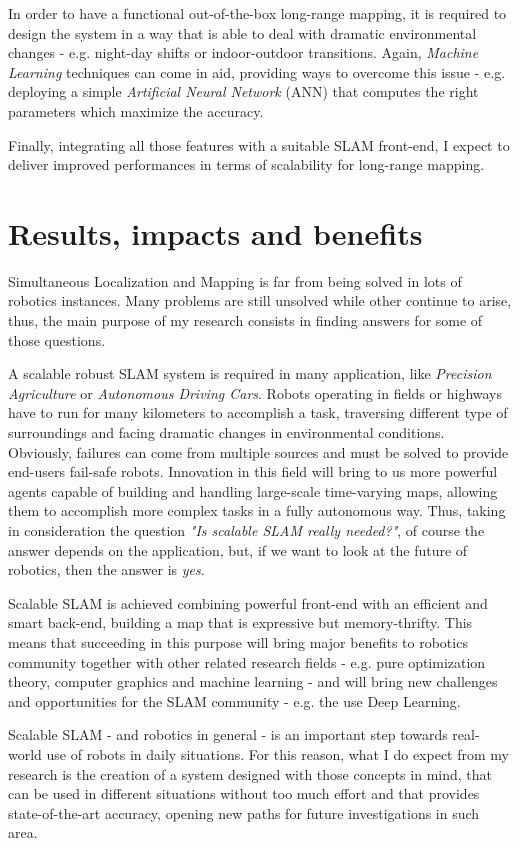 \documentclass[10pt,a4paper, notitlepage]{report}
\begin{document}
In order to have a functional out-of-the-box long-range mapping, it is required to design the system in a way that is able to deal with dramatic environmental changes - e.g. night-day shifts or indoor-outdoor transitions. Again, \textit{Machine Learning} techniques can come in aid, providing ways to overcome this issue - e.g. deploying a simple \textit{Artificial Neural Network} (ANN) that computes the right parameters which maximize the accuracy.

Finally, integrating all those features with a suitable SLAM front-end, I expect to deliver improved performances in terms of scalability for long-range mapping.

\section*{Results, impacts and benefits}
Simultaneous Localization and Mapping is far from being solved in lots of robotics instances. Many problems are still unsolved while other continue to arise, thus, the main purpose of my research consists in finding answers for some of those questions. 

A scalable robust SLAM system is required in many application, like \textit{Precision Agriculture} or \textit{Autonomous Driving Cars}. Robots operating in fields or highways have to run for many kilometers to accomplish a task, traversing different type of surroundings and facing dramatic changes in environmental conditions. Obviously, failures can come from multiple sources and must be solved to provide end-users fail-safe robots. Innovation in this field will bring to us more powerful agents capable of building and handling large-scale time-varying maps, allowing them to accomplish more complex tasks in a fully autonomous way. Thus, taking in consideration the question \textit{"Is scalable SLAM really needed?"}, of course the answer depends on the application, but, if we want to look at the future of robotics, then the answer is \textit{yes}.

Scalable SLAM is achieved combining powerful front-end with an efficient and smart back-end, building a map that is expressive but memory-thrifty. This means that succeeding in this purpose will bring major benefits to robotics community together with other related research fields - e.g. pure optimization theory, computer graphics and machine learning -  and will bring new challenges and opportunities for the SLAM community - e.g. the use Deep Learning. 

\vspace{5px}

Scalable SLAM - and robotics in general - is an important step towards real-world use of robots in daily situations. For this reason, what I do expect from my research is the creation of a system designed with those concepts in mind, that can be used in different situations without too much effort and that provides state-of-the-art accuracy, opening new paths for future investigations in such area.






\end{document}
